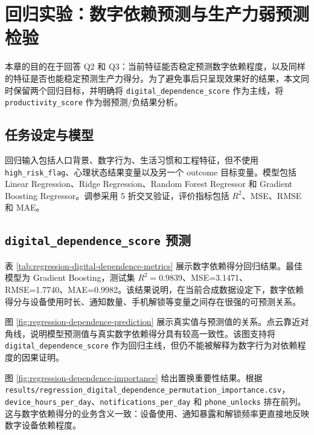\section{回归实验：数字依赖预测与生产力弱预测检验}

本章的目的在于回答 Q2 和 Q3：当前特征能否稳定预测数字依赖程度，以及同样的特征是否也能稳定预测生产力得分。为了避免事后只呈现效果好的结果，本文同时保留两个回归目标，并明确将 \texttt{digital\_dependence\_score} 作为主线，将 \texttt{productivity\_score} 作为弱预测/负结果分析。

\subsection{任务设定与模型}

回归输入包括人口背景、数字行为、生活习惯和工程特征，但不使用 \texttt{high\_risk\_flag}、心理状态结果变量以及另一个 outcome 目标变量。模型包括 Linear Regression、Ridge Regression、Random Forest Regressor 和 Gradient Boosting Regressor。调参采用 5 折交叉验证，评价指标包括 $R^2$、MSE、RMSE 和 MAE。

\subsection{\texttt{digital\_dependence\_score} 预测}

表 \ref{tab:regression-digital-dependence-metrics} 展示数字依赖得分回归结果。最佳模型为 Gradient Boosting，测试集 $R^2=0.9839$、MSE=3.1471、RMSE=1.7740、MAE=0.9982。该结果说明，在当前合成数据设定下，数字依赖得分与设备使用时长、通知数量、手机解锁等变量之间存在很强的可预测关系。



图 \ref{fig:regression-dependence-prediction} 展示真实值与预测值的关系。点云靠近对角线，说明模型预测值与真实数字依赖得分具有较高一致性。该图支持将 \texttt{digital\_dependence\_score} 作为回归主线，但仍不能被解释为数字行为对依赖程度的因果证明。


图 \ref{fig:regression-dependence-importance} 给出置换重要性结果。根据 \texttt{results/regression\_digital\_dependence\_permutation\_importance.csv}，\texttt{device\_hours\_per\_day}、\texttt{notifications\_per\_day} 和 \texttt{phone\_unlocks} 排在前列。这与数字依赖得分的业务含义一致：设备使用、通知暴露和解锁频率更直接地反映数字设备依赖程度。

